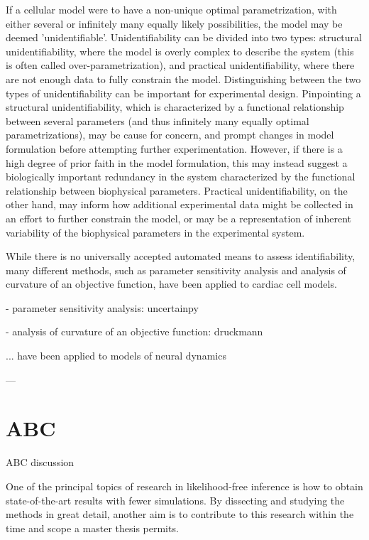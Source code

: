 If a cellular model were to have a non-unique optimal parametrization, with either several or infinitely many equally likely possibilities, the model may be deemed 'unidentifiable'. Unidentifiability can be divided into two types: structural unidentifiability, where the model is overly complex to describe the system (this is often called over-parametrization), and practical unidentifiability, where there are not enough data to fully constrain the model. Distinguishing between the two types of unidentifiability can be important for experimental design. Pinpointing a structural  unidentifiability, which is characterized by a functional relationship between several parameters (and thus infinitely many equally optimal parametrizations), may be cause for concern, and prompt changes in model formulation before attempting further experimentation. However, if there is a high degree of prior faith in the model formulation, this may instead suggest a biologically important redundancy in the system characterized by the functional relationship between biophysical parameters. Practical unidentifiability, on the other hand, may inform how additional experimental data might be collected in an effort to further constrain the model, or may be a representation of inherent variability of the biophysical parameters in the experimental system. 

While there is no universally accepted automated means to assess identifiability, many different methods, such as parameter sensitivity analysis and analysis of curvature of an objective function, have been applied to cardiac cell models.   


- parameter sensitivity analysis: uncertainpy 

- analysis of curvature of an objective function: druckmann

... have been applied to models of neural dynamics

---


\section{ABC}

ABC discussion 

One of the principal topics of research in likelihood-free inference is how to obtain state-of-the-art results with fewer simulations. By dissecting and studying the methods in great detail, another aim is to contribute to this research within the time and scope a master thesis permits. 


